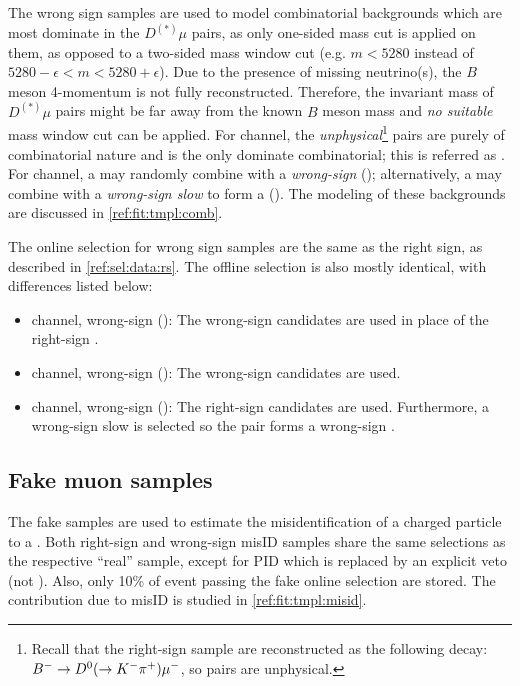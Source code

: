 The wrong sign samples are used to model combinatorial backgrounds which are
most dominate in the $D^{(*)}\mu$ pairs,
as only one-sided mass cut is applied on them, as opposed to a two-sided
mass window cut
(e.g. $m < 5280$ instead of $5280 - \epsilon < m < 5280 + \epsilon$).
Due to the presence of missing neutrino(s), the $B$ meson 4-momentum is not
fully reconstructed.
Therefore,
the invariant mass of $D^{(*)}\mu$ pairs might be far away from the known $B$
meson mass and \emph{no suitable} mass window cut can be applied.
For \Dz channel, the \emph{unphysical}\footnote{
    Recall that the right-sign sample are reconstructed as the following decay:
    ${{{B}^-}} \rightarrow {\ensuremath{{D}^0}} (\rightarrow {\ensuremath{{K}^-}} {\ensuremath{{\pi}^+}}) {\mu^-}$,
    so \Dz\mup pairs are unphysical.
} \Dz\mup pairs are purely of combinatorial
nature and is the only dominate combinatorial;
this is referred as \BComb.
For \Dstar channel, a \Dstarp may randomly combine with a
\emph{wrong-sign \mup} (\BComb); alternatively, a \Dz may combine with a
\emph{wrong-sign slow \pim} to form a \Dstarm (\DstComb).
The modeling of these backgrounds are discussed in
\cref{ref:fit:tmpl:comb}.

The online selection for wrong sign samples are the same as the right sign,
as described in \cref{ref:sel:data:rs}.
The offline selection is also mostly identical, with differences listed below:

\begin{itemize}
    \item \Dz channel, wrong-sign \muon (\BComb):
        The wrong-sign \Dz\mup candidates are used in place of the right-sign
        \Dz\mun.
    \item \Dstar channel, wrong-sign \muon (\BComb):
        The wrong-sign \Dz\mup candidates are used.
    \item \Dstar channel, wrong-sign \pion (\DstComb):
        The right-sign \Dz\mun candidates are used.
        Furthermore, a wrong-sign slow \pim is selected so the \Dz\pim pair
        forms a wrong-sign \Dstarm.
\end{itemize}


\subsection{Fake muon samples}
\label{ref:sel:data:fake-mu}

The fake \muon samples are used to estimate the misidentification of a charged
particle to a \muon.
Both right-sign and wrong-sign misID samples share the same selections
as the respective ``real'' \muon sample,
except for \muon PID which is replaced by an explicit \muon veto
(not \isMuon).
Also, only 10\% of event passing the fake \muon online selection are stored.
The contribution due to \muon misID is studied in \cref{ref:fit:tmpl:misid}.
